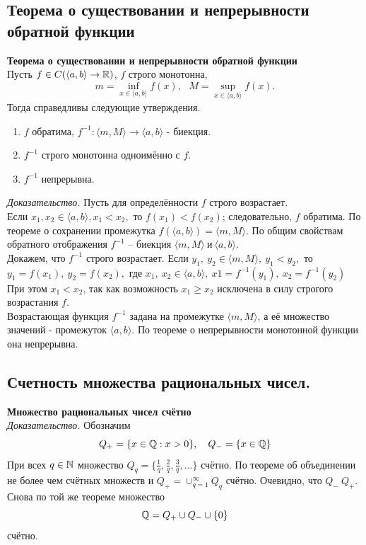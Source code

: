 \subsection{Теорема о существовании и непрерывности обратной функции}
\textbf{Теорема о существовании и непрерывности обратной функции} \\
Пусть $f \in C(\langle a, b \rangle \to \operatorname*{\mathbb{R}})$, $f$ строго монотонна, $$m = \inf_{x \in \langle a, b \rangle} f(x),\ \ \ M = \sup_{x \in \langle a, b \rangle} f(x).$$
Тогда справедливы следующие утверждения.\\
\begin{enumerate}
    \item $f$ обратима, $f^{-1}:\langle m, M \rangle \to \langle a, b\rangle$ - биекция.
    \item $f^{-1}$ строго монотонна одноимённо с $f$.
    \item $f^{-1}$ непрерывна.
\end{enumerate}
\textit{Доказательство.} Пусть для определённости $f$ строго возрастает. \\
Если $x_1, x_2 \in \langle a, b \rangle, x_1 < x_2,$ то $f(x_1) < f(x_2)$; следовательно, 
$f$ обратима. По теореме о сохранении промежутка $f(\langle a, b \rangle) = \langle m, M\rangle.$ 
По общим свойствам обратного отображения $f^{-1}$ -- биекция $\langle m, M\rangle\  \text{и}\  \langle a, b\rangle$.\\
Докажем, что $f^{-1}$ строго возрастает. Если $y_1,\ y_2 \in \langle m, M\rangle,\ y_1<y_2,$ то $y_1 = f(x_1),\ y_2 = f(x_2),$ где $x_1,\ x_2 \in \langle a, b\rangle,\ x1 = f^{-1}(y_1),\ x_2 = f^{-1}(y_2)$ При этом $x_1 < x_2$, так как возможность $x_1 \geq x_2$ исключена в силу строгого возрастания $f$.\\
Возрастающая функция $f^{-1}$ задана на промежутке $\langle m, M\rangle$, а её множество значений - промежуток $\langle a, b\rangle$. По теореме о непрерывности монотонной функции она непрерывна.
\subsection{Счетность множества рациональных чисел.}
\textbf{Множество рациональных чисел счётно} \\
\textit{Доказательство.} Обозначим $$Q_+ = \{x \in \operatorname*{\mathbb{Q}}:  x > 0\}, \ \ \ Q_- = \{x \in \operatorname*{\mathbb{Q}}\}$$
При всех $q \in \operatorname*{\mathbb{N}}$ множество $Q_q = \{\frac{1}{q}, \frac{2}{q}, \frac{3}{q},...\}$ счётно. По теореме об объединении не более чем счётных множеств и $Q_+ = \cup_{q=1}^{\infty} Q_q$ счётно. 
Очевидно, что $Q_- ~ Q_+$. Снова по той же теореме множество $$\operatorname*{\mathbb{Q}} = Q_+ \cup Q_-\cup \{0\}$$
счётно.

